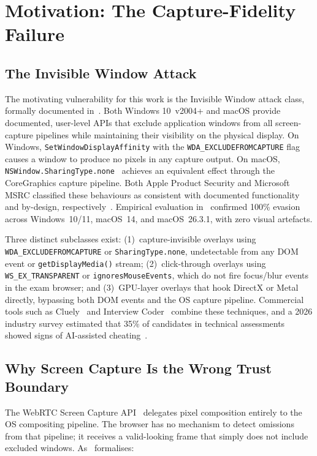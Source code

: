 \documentclass[conference]{IEEEtran}
\begin{document}
\section{Motivation: The Capture-Fidelity Failure}

\subsection{The Invisible Window Attack}

The motivating vulnerability for this work is the Invisible Window attack class, formally documented in~\cite{abedini2026invisible}. Both Windows 10~v2004+ and macOS provide documented, user-level APIs that exclude application windows from all screen-capture pipelines while maintaining their visibility on the physical display. On Windows, \texttt{SetWindowDisplayAffinity} with the \texttt{WDA\_EXCLUDEFROMCAPTURE} flag~\cite{microsoft2025setwindow} causes a window to produce no pixels in any capture output. On macOS, \texttt{NSWindow.SharingType.none}~\cite{apple2025sharingtype} achieves an equivalent effect through the CoreGraphics capture pipeline. Both Apple Product Security and Microsoft MSRC classified these behaviours as consistent with documented functionality and by-design, respectively~\cite{abedini2026invisible}. Empirical evaluation in~\cite{abedini2026invisible} confirmed 100\% evasion across Windows~10/11, macOS~14, and macOS~26.3.1, with zero visual artefacts.

Three distinct subclasses exist: (1)~capture-invisible overlays using \texttt{WDA\_EXCLUDEFROMCAPTURE} or \texttt{SharingType.none}, undetectable from any DOM event or \texttt{getDisplayMedia()} stream; (2)~click-through overlays using \texttt{WS\_EX\_TRANSPARENT} or \texttt{ignoresMouseEvents}, which do not fire focus/blur events in the exam browser; and (3)~GPU-layer overlays that hook DirectX or Metal directly, bypassing both DOM events and the OS capture pipeline. Commercial tools such as Cluely~\cite{cluely2025} and Interview Coder~\cite{interviewcoder2026} combine these techniques, and a 2026 industry survey estimated that 35\% of candidates in technical assessments showed signs of AI-assisted cheating~\cite{fabrichq2026cheating}.

\subsection{Why Screen Capture Is the Wrong Trust Boundary}

The WebRTC Screen Capture API~\cite{bruaroey2025screen} delegates pixel composition entirely to the OS compositing pipeline. The browser has no mechanism to detect omissions from that pipeline; it receives a valid-looking frame that simply does not include excluded windows. As~\cite{abedini2026invisible} formalises:
\end{document}

